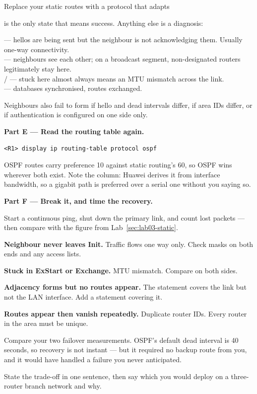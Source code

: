 \begin{labproject}{Replace your static routes with a protocol that adapts}
\begin{keyidea}
 is the only state that means success. Anything else is a diagnosis:

 --- hellos are being sent but the neighbour is not acknowledging them. Usually one-way connectivity.\\
 --- neighbours see each other; on a broadcast segment, non-designated routers legitimately stay here.\\
 /  --- stuck here almost always means an MTU mismatch across the link.\\
 --- databases synchronised, routes exchanged.

Neighbours also fail to form if hello and dead intervals differ, if area IDs differ, or if authentication is configured on one side only.
\end{keyidea}

\medskip\noindent\textbf{Part E --- Read the routing table again.}\par

\begin{lstlisting}[style=dcnterminal]
<R1> display ip routing-table protocol ospf
\end{lstlisting}

OSPF routes carry preference 10 against static routing's 60, so OSPF wins wherever both exist. Note the  column: Huawei derives it from interface bandwidth, so a gigabit path is preferred over a serial one without you saying so.

\medskip\noindent\textbf{Part F --- Break it, and time the recovery.}\par
Start a continuous ping, shut down the primary link, and count lost packets --- then compare with the figure from Lab~\ref{sec:lab03-static}.

\begin{troubleshoot}
\textbf{Neighbour never leaves Init.} Traffic flows one way only. Check masks on both ends and any access lists.

\textbf{Stuck in ExStart or Exchange.} MTU mismatch. Compare  on both sides.

\textbf{Adjacency forms but no routes appear.} The  statement covers the link but not the LAN interface. Add a statement covering it.

\textbf{Routes appear then vanish repeatedly.} Duplicate router IDs. Every router in the area must be unique.
\end{troubleshoot}

\begin{tryit}
Compare your two failover measurements. OSPF's default dead interval is 40 seconds, so recovery is not instant --- but it required no backup route from you, and it would have handled a failure you never anticipated.

State the trade-off in one sentence, then say which you would deploy on a three-router branch network and why.
\end{tryit}
\end{labproject}

